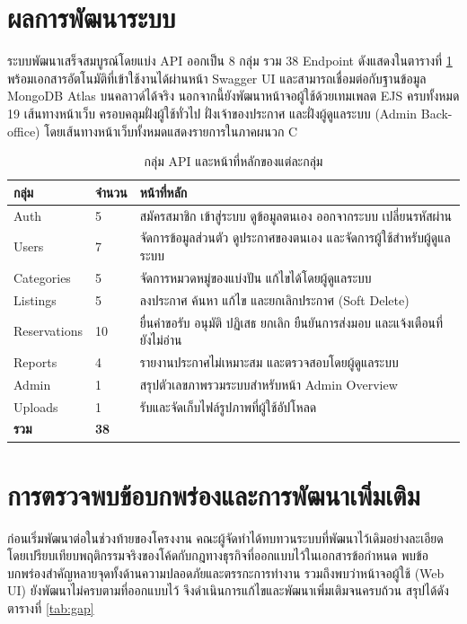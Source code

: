 \documentclass[12pt,a4paper]{report}
\begin{document}
\section{ผลการพัฒนาระบบ}

ระบบพัฒนาเสร็จสมบูรณ์โดยแบ่ง API ออกเป็น 8 กลุ่ม รวม 38 Endpoint ดังแสดงในตารางที่ \ref{tab:api} พร้อมเอกสารอัตโนมัติที่เข้าใช้งานได้ผ่านหน้า Swagger UI และสามารถเชื่อมต่อกับฐานข้อมูล MongoDB Atlas บนคลาวด์ได้จริง นอกจากนี้ยังพัฒนาหน้าจอผู้ใช้ด้วยเทมเพลต EJS ครบทั้งหมด 19 เส้นทางหน้าเว็บ ครอบคลุมฝั่งผู้ใช้ทั่วไป ฝั่งเจ้าของประกาศ และฝั่งผู้ดูแลระบบ (Admin Back-office) โดยเส้นทางหน้าเว็บทั้งหมดแสดงรายการในภาคผนวก C

\begin{table}[htbp]
\centering
\caption{กลุ่ม API และหน้าที่หลักของแต่ละกลุ่ม}
\label{tab:api}
\begin{tabularx}{\textwidth}{l l X}
\toprule
\textbf{กลุ่ม} & \textbf{จำนวน} & \textbf{หน้าที่หลัก}\\
\midrule
Auth & 5 & สมัครสมาชิก เข้าสู่ระบบ ดูข้อมูลตนเอง ออกจากระบบ เปลี่ยนรหัสผ่าน\\
Users & 7 & จัดการข้อมูลส่วนตัว ดูประกาศของตนเอง และจัดการผู้ใช้สำหรับผู้ดูแลระบบ\\
Categories & 5 & จัดการหมวดหมู่ของแบ่งปัน แก้ไขได้โดยผู้ดูแลระบบ\\
Listings & 5 & ลงประกาศ ค้นหา แก้ไข และยกเลิกประกาศ (Soft Delete)\\
Reservations & 10 & ยื่นคำขอรับ อนุมัติ ปฏิเสธ ยกเลิก ยืนยันการส่งมอบ และแจ้งเตือนที่ยังไม่อ่าน\\
Reports & 4 & รายงานประกาศไม่เหมาะสม และตรวจสอบโดยผู้ดูแลระบบ\\
Admin & 1 & สรุปตัวเลขภาพรวมระบบสำหรับหน้า Admin Overview\\
Uploads & 1 & รับและจัดเก็บไฟล์รูปภาพที่ผู้ใช้อัปโหลด\\
\midrule
\textbf{รวม} & \textbf{38} & \\
\bottomrule
\end{tabularx}
\end{table}

\section{การตรวจพบข้อบกพร่องและการพัฒนาเพิ่มเติม}

ก่อนเริ่มพัฒนาต่อในช่วงท้ายของโครงงาน คณะผู้จัดทำได้ทบทวนระบบที่พัฒนาไว้เดิมอย่างละเอียด โดยเปรียบเทียบพฤติกรรมจริงของโค้ดกับกฎทางธุรกิจที่ออกแบบไว้ในเอกสารข้อกำหนด พบข้อบกพร่องสำคัญหลายจุดทั้งด้านความปลอดภัยและตรรกะการทำงาน รวมถึงพบว่าหน้าจอผู้ใช้ (Web UI) ยังพัฒนาไม่ครบตามที่ออกแบบไว้ จึงดำเนินการแก้ไขและพัฒนาเพิ่มเติมจนครบถ้วน สรุปได้ดังตารางที่ \ref{tab:gap}
\end{document}
